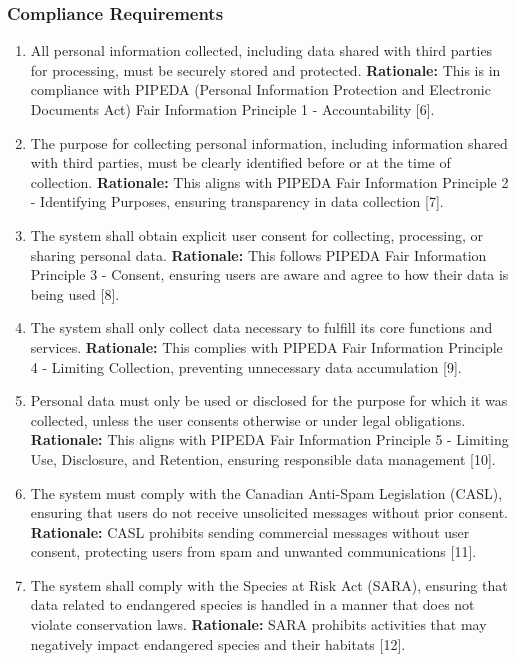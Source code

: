 \documentclass[]{article}
\begin{document}
\subsubsection{Compliance Requirements}
\label{ssub:compliance_requirements}
\begin{enumerate}[{LR-COMP}1. ]
	\item All personal information collected, including data shared with third parties for processing, must be securely stored and protected. 
    \newline \textbf{Rationale:} This is in compliance with PIPEDA (Personal Information Protection and Electronic Documents Act) Fair Information Principle 1 - Accountability [6].

    \item The purpose for collecting personal information, including information shared with third parties, must be clearly identified before or at the time of collection. 
    \newline \textbf{Rationale:} This aligns with PIPEDA Fair Information Principle 2 - Identifying Purposes, ensuring transparency in data collection [7].

    \item The system shall obtain explicit user consent for collecting, processing, or sharing personal data. 
    \newline \textbf{Rationale:} This follows PIPEDA Fair Information Principle 3 - Consent, ensuring users are aware and agree to how their data is being used [8].

    \item The system shall only collect data necessary to fulfill its core functions and services. 
    \newline \textbf{Rationale:} This complies with PIPEDA Fair Information Principle 4 - Limiting Collection, preventing unnecessary data accumulation [9].

    \item Personal data must only be used or disclosed for the purpose for which it was collected, unless the user consents otherwise or under legal obligations. 
    \newline \textbf{Rationale:} This aligns with PIPEDA Fair Information Principle 5 - Limiting Use, Disclosure, and Retention, ensuring responsible data management [10].

    \item The system must comply with the Canadian Anti-Spam Legislation (CASL), ensuring that users do not receive unsolicited messages without prior consent. 
    \newline \textbf{Rationale:} CASL prohibits sending commercial messages without user consent, protecting users from spam and unwanted communications [11].

    \item The system shall comply with the Species at Risk Act (SARA), ensuring that data related to endangered species is handled in a manner that does not violate conservation laws. 
    \newline \textbf{Rationale:} SARA prohibits activities that may negatively impact endangered species and their habitats [12].
 
\end{enumerate}
\end{document}
